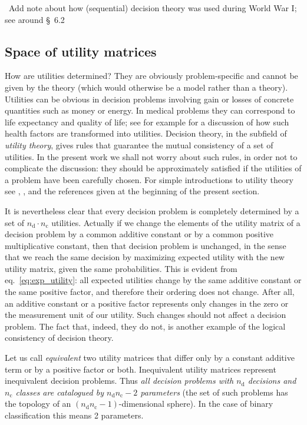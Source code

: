\documentclass[\ifafour a4paper,12pt,\else a5paper,10pt,\fi%
onecolumn,oneside,article,%
british%
]{memoir}
\theoremstyle{remark}
\theoremstyle{innote}
\renewcommand*{\|}[1][]{\nonscript\:#1\vert\nonscript\:\mathopen{}}
\newcommand*{\sect}{\S}%
\newcommand*{\eqn}{eq.}%
\newcommand*{\wrench}{{\fontencoding{U}\fontfamily{fontawesomethree}\selectfont\symbol{114}}}
\newcommand{\mynote}[1]{ {\color{notecolour}#1}}
\newcommand*{\nd}{n_{\textrm{d}}}
\newcommand*{\nc}{n_{\textrm{c}}}
\begin{document}
\mynote{\wrench\ Add note about how (sequential) decision theory was used during World War I; see  \textcites{good1950} around \sect~6.2 }

\subsection{Space of utility matrices}
\label{sec:dt_space_util}

How are utilities determined? They are obviously problem-specific and cannot be given by the theory (which would otherwise be a model rather than a theory). Utilities can be  obvious in decision problems involving gain or losses of concrete quantities such as money or energy. In medical problems they can correspond to life expectancy and quality of life; see for example \textcite{soxetal1988_r2013} for a discussion of how such health factors are transformed into utilities. Decision theory, in the subfield of \emph{utility theory}, gives rules that guarantee the mutual consistency of a set of utilities. In the present work we shall not worry about such rules, in order not to complicate the discussion: they should be approximately satisfied if the utilities of a problem have been carefully chosen. For simple introductions to utility theory see \textcite[\sect~15.2]{russelletal1995_r2022}, \textcite[pp.~201--205]{north1968}, and the references given at the beginning of the present section.

It is nevertheless clear that every decision problem is completely determined by a set of $\nd \cdot \nc$ utilities. Actually if we change the elements of the utility matrix of a decision problem by a common additive constant or by a common positive multiplicative constant, then that decision problem is unchanged, in the sense that we reach the same decision by maximizing expected utility with the new utility matrix, given the same probabilities. This is evident from \eqn~\eqref{eq:exp_utility}: all expected utilities change by the same additive constant or the same positive factor, and therefore their ordering does not change. After all, an additive constant or a positive factor represents only changes in the zero or the measurement unit of our utility. Such changes should not affect a decision problem. The fact that, indeed, they do not, is another example of the logical consistency of decision theory.

Let us call \emph{equivalent} two utility matrices that differ only by a constant additive term or by a positive factor or both. Inequivalent utility matrices represent inequivalent decision problems. Thus \emph{all decision problems with $\nd$ decisions and $\nc$ classes are catalogued by\; $\nd \nc - 2$\; parameters} (the set of such problems has the topology of an $(\nd\nc-1)$-dimensional sphere). In the case of binary classification this means 2 parameters.
\end{document}
